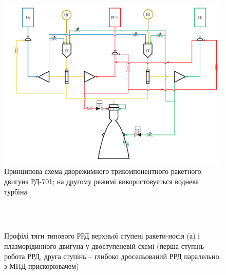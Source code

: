 \begin{figure}
	\centering
	\includegraphics[width=0.6\textheight, angle=0,origin=c]{chapter_3/3comp_engine.png}
	\caption{Принципова схема дворежимного трикомпонентного ракетного двигуна РД-701; на другому режимі використовується воднева турбіна}
	\label{fig:3comp_engine}
\end{figure}

\begin{figure}[h!]
	\centering
	\\ %
	\\
	\caption{Профілі тяги типового РРД верхньої ступені ракети-носія (а) і плазморідинного двигуна у двоступеневій схемі (перша ступінь -- робота РРД, друга ступінь -- глибоко дросельований РРД паралельно з МПД-прискорювачем)}
\end{figure}

